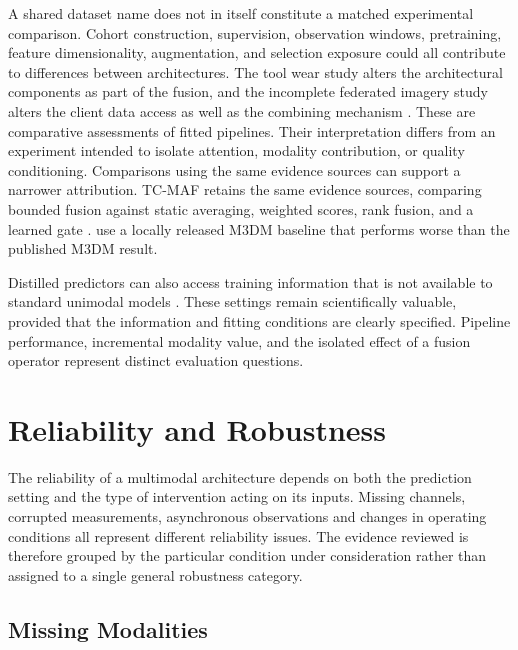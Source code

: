 A shared dataset name does not in itself constitute a matched experimental comparison.
Cohort construction, supervision, observation windows, pretraining, feature dimensionality,
augmentation, and selection exposure could all contribute to differences between architectures.
The tool wear study alters the architectural components as part of the fusion, and the incomplete
federated imagery study alters the client data access as well as the combining mechanism
\parencite{P045,P051}.
These are comparative assessments of fitted pipelines. Their interpretation differs from an
experiment intended to isolate attention, modality contribution, or quality conditioning.
Comparisons using the same evidence sources can support a narrower attribution. TC-MAF retains the
same evidence sources, comparing bounded fusion against static averaging, weighted scores, rank
fusion, and a learned gate \parencite[Table~3]{P026}.
\textcite[Table~4]{P033} use a locally released M3DM baseline that performs
worse than the published M3DM result.

Distilled predictors can also access training information that is not available to standard unimodal
models \parencite{Li2025PGMTKD}.
These settings remain scientifically valuable, provided that the information and fitting conditions
are clearly specified. Pipeline performance, incremental modality value, and the isolated effect of
a fusion operator represent distinct evaluation questions.

\section{Reliability and Robustness}

The reliability of a multimodal architecture depends on both the prediction setting and the type of
intervention acting on its inputs.
Missing channels, corrupted measurements, asynchronous observations and changes in operating
conditions all represent different reliability issues. The evidence reviewed is therefore grouped by
the particular condition under consideration rather than assigned to a single general robustness
category.

\subsection{Missing Modalities}

